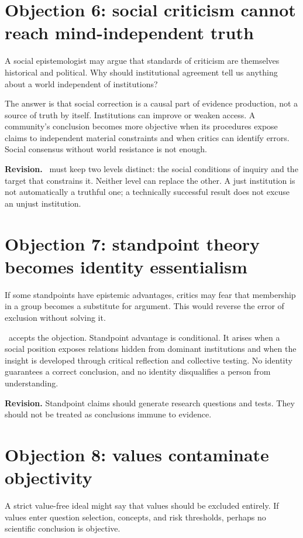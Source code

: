 \section{Objection 6: social criticism cannot reach mind-independent truth}

A social epistemologist may argue that standards of criticism are themselves
historical and political. Why should institutional agreement tell us anything
about a world independent of institutions?

The answer is that social correction is a causal part of evidence production,
not a source of truth by itself. Institutions can improve or weaken access.
A community's conclusion becomes more objective when its procedures expose
claims to independent material constraints and when critics can identify
errors. Social consensus without world resistance is not enough.

\textbf{Revision.} \RCR\ must keep two levels distinct: the social conditions of
inquiry and the target that constrains it. Neither level can replace the other.
A just institution is not automatically a truthful one; a technically
successful result does not excuse an unjust institution.

\section{Objection 7: standpoint theory becomes identity essentialism}

If some standpoints have epistemic advantages, critics may fear that
membership in a group becomes a substitute for argument. This would reverse
the error of exclusion without solving it.

\RCR\ accepts the objection. Standpoint advantage is conditional. It arises
when a social position exposes relations hidden from dominant institutions and
when the insight is developed through critical reflection and collective
testing. No identity guarantees a correct conclusion, and no identity
disqualifies a person from understanding.

\textbf{Revision.} Standpoint claims should generate research questions and
tests. They should not be treated as conclusions immune to evidence.

\section{Objection 8: values contaminate objectivity}

A strict value-free ideal might say that values should be excluded entirely.
If values enter question selection, concepts, and risk thresholds, perhaps no
scientific conclusion is objective.

